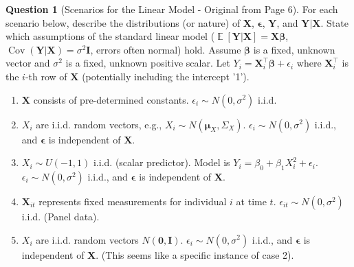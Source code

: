 \documentclass[11pt, a4paper]{article}
\DeclareMathOperator{\E}{\mathbb{E}}             %
\DeclareMathOperator{\Cov}{\mathrm{Cov}}         %
\theoremstyle{definition}
\newtheorem{question}[theorem]{Question} %
\theoremstyle{remark}
\newcommand{\mat}[1]{\mathbf{#1}}       %
\newcommand{\vect}[1]{\bm{#1}}          %
\newcommand{\transpose}{^{\top}}        %
\begin{document}
\begin{question}[Scenarios for the Linear Model - Original from Page 6]
For each scenario below, describe the distributions (or nature) of $\mat{X}$, $\vect{\epsilon}$, $\vect{Y}$, and $\vect{Y}|\mat{X}$. State which assumptions of the standard linear model ($\E[\vect{Y}|\mat{X}]=\mat{X}\vect{\beta}$, $\Cov(\vect{Y}|\mat{X})=\sigma^2\mat{I}$, errors often normal) hold. Assume $\vect{\beta}$ is a fixed, unknown vector and $\sigma^2$ is a fixed, unknown positive scalar. Let $Y_i = \mat{X}_i\transpose \vect{\beta} + \epsilon_i$ where $\mat{X}_i\transpose$ is the $i$-th row of $\mat{X}$ (potentially including the intercept '1').

\begin{enumerate}
    \item $\mat{X}$ consists of pre-determined constants. $\epsilon_i \sim N(0, \sigma^2)$ i.i.d.
    \item $X_i$ are i.i.d. random vectors, e.g., $X_i \sim N(\vect{\mu}_X, \Sigma_X)$. $\epsilon_i \sim N(0, \sigma^2)$ i.i.d., and $\vect{\epsilon}$ is independent of $\mat{X}$.
    \item $X_i \sim U(-1, 1)$ i.i.d. (scalar predictor). Model is $Y_i = \beta_0 + \beta_1 X_i^2 + \epsilon_i$. $\epsilon_i \sim N(0, \sigma^2)$ i.i.d., and $\vect{\epsilon}$ is independent of $\mat{X}$.
    \item $\mat{X}_{it}$ represents fixed measurements for individual $i$ at time $t$. $\epsilon_{it} \sim N(0, \sigma^2)$ i.i.d. (Panel data).
    \item $X_i$ are i.i.d. random vectors $N(\vect{0}, \mat{I})$. $\epsilon_i \sim N(0, \sigma^2)$ i.i.d., and $\vect{\epsilon}$ is independent of $\mat{X}$. (This seems like a specific instance of case 2).
\end{enumerate}
\end{question} %
\end{document}
